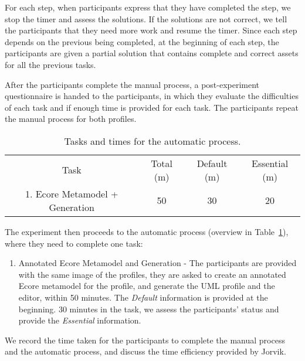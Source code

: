 For each step, when participants express that they have completed the step, we stop the timer and assess the solutions. 
If the solutions are not correct, we tell the participants that they need more work and resume the timer.
Since each step depends on the previous being completed, at the beginning of each step, the participants are given a partial solution that contains complete and correct assets for all the previous tasks.


After the participants complete the manual process, a post-experiment questionnaire is handed to the participants, in which they evaluate the difficulties of each task and if enough time is provided for each task.
The participants repeat the manual process for both profiles.

\begin{table}[ht!]
	\centering
	\setlength{\tabcolsep}{3.5pt} 
	\begin{tabular}{|c|c|c|c|}
		Task & Total (m) & Default (m) & Essential (m) \\ 
		1. Ecore Metamodel + Generation & 50 & 30 & 20 \\
	\end{tabular}
	\label{tab:automatic}
	\caption{Tasks and times for the automatic process.}
\end{table}


The experiment then proceeds to the automatic process (overview in Table~\ref{tab:automatic}), where they need to complete one task:
\begin{enumerate}
	\item Annotated Ecore Metamodel and Generation - The participants are provided with the same image of the profiles, they are asked to create an annotated Ecore metamodel for the profile, and generate the UML profile and the editor, within 50 minutes.
	The \textit{Default} information is provided at the beginning. 
	30 minutes in the task, we assess the participants' status and provide the \textit{Essential} information.
\end{enumerate}

We record the time taken for the participants to complete the manual process and the automatic process, and discuss the time efficiency provided by Jorvik.





